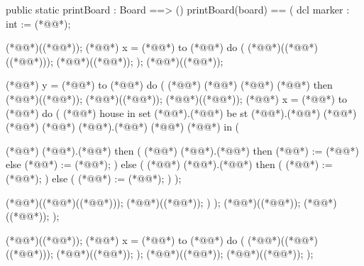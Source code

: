 \begin{vdm_al}
  public static printBoard : Board ==> ()
   printBoard(board) == (
    dcl marker : int := (*@@*);
   
    (*@@*)((*@@*));
    (*@@*) x = (*@@*) to (*@@*) do (
     (*@@*)((*@@*)((*@@*))); 
     (*@@*)((*@@*));
    );
    (*@@*)((*@@*));
    
    (*@@*) y = (*@@*) to (*@@*) do (
     (*@@*) (*@@*) (*@\notcovered{<>}@*) (*@@*) then (*@@*)((*@@*));
     (*@@*)((*@@*));
     (*@@*)((*@@*));
     (*@@*) x = (*@@*) to (*@@*) do (
      (*@@*) house in set (*@@*).(*@@*) be st (*@@*).(*@@*) (*@\notcovered{=}@*) (*@@*) (*@@*) (*@@*).(*@@*) (*@\notcovered{=}@*) (*@@*) in (
      
       (*@@*) (*@@*).(*@@*) then (
        (*@@*) (*@@*).(*@@*) then
         (*@@*) := (*@@*)
        else
         (*@@*) := (*@@*);
       )
       else (
        (*@@*) (*@@*).(*@@*) then (
         (*@@*) := (*@@*);
        )
        else (
         (*@@*) := (*@@*);
        )
       );

       (*@@*)((*@@*)((*@@*)));
       (*@@*)((*@@*));
      )
     );
     (*@@*)((*@@*));
     (*@@*)((*@@*));
    );

    (*@@*)((*@@*));
    (*@@*) x = (*@@*) to (*@@*) do (
     (*@@*)((*@@*)((*@@*))); 
     (*@@*)((*@@*));
    );
    (*@@*)((*@@*));
    (*@@*)((*@@*));
   );
  

\end{vdm_al}
